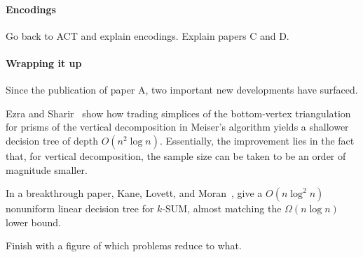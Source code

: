 \paragraph{Encodings}
Go back to ACT and explain encodings. Explain papers C and D.

\paragraph{Wrapping it up}

Since the publication of paper A, two important new developments have surfaced.

Ezra and Sharir~\cite{ES17} show how trading simplices of the bottom-vertex
triangulation for prisms of the vertical decomposition in Meiser's algorithm
yields a shallower decision tree of depth \(O(n^2 \log n)\). Essentially, the
improvement lies in the fact that, for vertical decomposition, the sample size
can be taken to be an order of magnitude smaller.



In a breakthrough paper, Kane, Lovett, and Moran~\cite{KLM18}, give a
\(O(n \log^2 n)\) nonuniform linear decision tree for \(k\)-SUM, almost
matching the \(\Omega(n \log n)\) lower bound.


Finish with a figure of which problems reduce to what.
